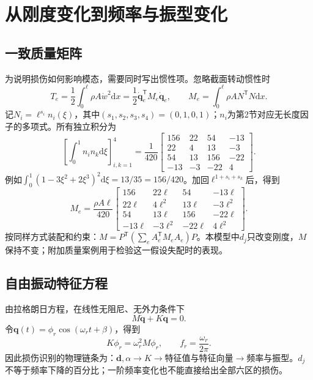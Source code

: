 \documentclass[UTF8,a4paper,11pt,fontset=fandol]{ctexart}
\numberwithin{equation}{section}
\newcommand{\dd}{\mathrm d}
\newcommand{\T}{^{\mathsf T}}
\begin{document}
\newpage
\section{从刚度变化到频率与振型变化}
\subsection{一致质量矩阵}
为说明损伤如何影响模态，需要同时写出惯性项。忽略截面转动惯性时
\begin{equation}
T_e=\frac12\int_0^\ell\rho A\dot w^2\dd x
=\frac12\dot{\bm q}_e\T M_e\dot{\bm q}_e,\qquad
M_e=\int_0^\ell\rho A N\T N\dd x.
\end{equation}
记$N_i=\ell^{s_i}n_i(\xi)$，其中$(s_1,s_2,s_3,s_4)=(0,1,0,1)$；$n_i$为第2节对应无长度因子的多项式。所有独立积分为
\begin{equation}
\left[\int_0^1n_i n_k\dd\xi\right]_{i,k=1}^4
=\frac1{420}\begin{bmatrix}
156&22&54&-13\\22&4&13&-3\\54&13&156&-22\\-13&-3&-22&4
\end{bmatrix}.
\end{equation}
例如$\int_0^1(1-3\xi^2+2\xi^3)^2\dd\xi=13/35=156/420$。加回$\ell^{1+s_i+s_k}$后，得到
\begin{equation}
M_e=\frac{\rho A\ell}{420}\begin{bmatrix}
156&22\ell&54&-13\ell\\
22\ell&4\ell^2&13\ell&-3\ell^2\\
54&13\ell&156&-22\ell\\
-13\ell&-3\ell^2&-22\ell&4\ell^2
\end{bmatrix}.
\end{equation}
按同样方式装配和约束：$M=P\T(\sum_e A_e\T M_eA_e)P$。本模型中$d_j$只改变刚度，$M$保持不变；附加质量案例用于检验这一假设失配时的表现。
\subsection{自由振动特征方程}
由拉格朗日方程，在线性无阻尼、无外力条件下
\begin{equation}M\ddot{\bm q}+K\bm q=0.\end{equation}
令$\bm q(t)=\phi_r\cos(\omega_rt+\beta)$，得到
\begin{equation}\boxed{K\phi_r=\omega_r^2M\phi_r,\qquad f_r=\frac{\omega_r}{2\pi}.}\end{equation}
因此损伤识别的物理链条为：$\bm d,\alpha\rightarrow K\rightarrow$特征值与特征向量$\rightarrow$频率与振型。$d_j$不等于频率下降的百分比；一阶频率变化也不能直接给出全部六区的损伤。
\end{document}
